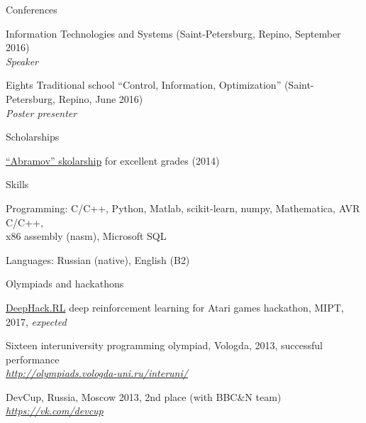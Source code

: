\documentclass{resume} %
\begin{document}
\begin{rSection}{Conferences}
\item Information Technologies and Systems (Saint-Petersburg, Repino, September 2016)\\
{\em Speaker}
\item Eights Traditional school “Control, Information, Optimization” (Saint-Petersburg, Repino, June 2016)\\
{\em Poster presenter}
\end{rSection}

\begin{rSection}{Scholarships}
\item \href{http://phystech-foundation.org/}{``Abramov'' skolarship} for excellent grades (2014)
\end{rSection}

\begin{rSection}{Skills}
\item Programming: C/C++, Python, Matlab, scikit-learn, numpy, Mathematica, AVR C/C++,\\ x86 assembly (nasm), Microsoft SQL
\item Languages: Russian (native), English (B2)
\end{rSection}


\begin{rSection}{Olympiads and hackathons}
\item \href{http://rl.deephack.me/}{DeepHack.RL} deep reinforcement learning for Atari games hackathon, MIPT, 2017, {\em expected}
\item Sixteen interuniversity programming olympiad, Vologda, 2013, successful performance \\
\hfill {\em \url{http://olympiads.vologda-uni.ru/interuni/}}
\item DevCup, Russia, Moscow 2013, 2nd place (with BBC\&N team)\\
\hfill {\em \url{https://vk.com/devcup}}
\end{rSection}
\end{document}
